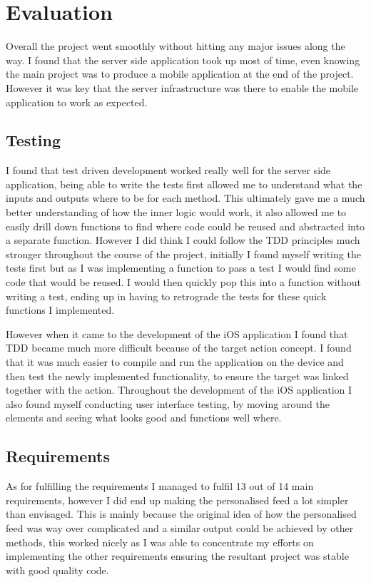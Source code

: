 \chapter{Evaluation}

Overall the project went smoothly without hitting any major issues along the way. I found that the server side application took up most of time, even knowing the main project was to produce a mobile application at the end of the project. However it was key that the server infrastructure was there to enable the mobile application to work as expected.

\section{Testing}
	I found that test driven development worked really well for the server side application, being able to write the tests first allowed me to understand what the inputs and outputs where to be for each method. This ultimately gave me a much better understanding of how the inner logic would work, it also allowed me to easily drill down functions to find where code could be reused and abstracted into a separate function. However I did think I could follow the TDD principles much stronger throughout the course of the project, initially I found myself writing the tests first but as I was implementing a function to pass a test I would find some code that would be reused. I would then quickly pop this into a function without writing a test, ending up in having to retrograde the tests for these quick functions I implemented. 

	However when it came to the development of the iOS application I found that TDD became much more difficult because of the target action concept. I found that it was much easier to compile and run the application on the device and then test the newly implemented functionality, to ensure the target was linked together with the action. Throughout the development of the iOS application I also found myself conducting user interface testing, by moving around the elements and seeing what looks good and functions well where. 

\section{Requirements}
	As for fulfilling the requirements I managed to fulfil 13 out of 14 main requirements, however I did end up making the personalised feed a lot simpler than envisaged. This is mainly because the original idea of how the personalised feed was way over complicated and a similar output could be achieved by other methods, this worked nicely as I was able to concentrate my efforts on implementing the other requirements ensuring the resultant project was stable with good quality code. 

